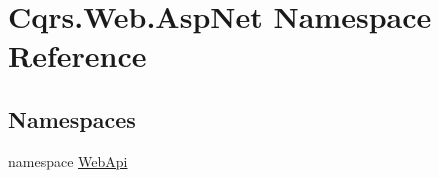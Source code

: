 \hypertarget{namespaceCqrs_1_1Web_1_1AspNet}{}\section{Cqrs.\+Web.\+Asp\+Net Namespace Reference}
\label{namespaceCqrs_1_1Web_1_1AspNet}
\subsection*{Namespaces}
\begin{DoxyCompactItemize}
\item 
namespace \hyperlink{namespaceCqrs_1_1Web_1_1AspNet_1_1WebApi}{Web\+Api}
\end{DoxyCompactItemize}
